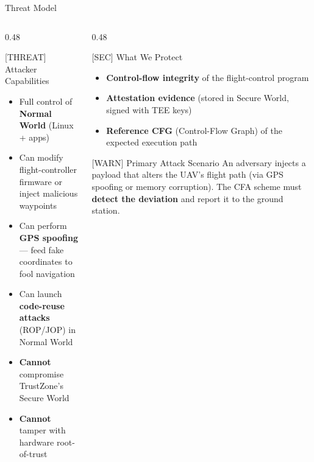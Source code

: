 \documentclass[aspectratio=169, 10pt]{beamer}
\begin{document}
\begin{frame}{Threat Model}
    \begin{columns}[T]
        \begin{column}{0.48\textwidth}
            \begin{warnbox}{[THREAT] Attacker Capabilities}
                \begin{itemize}
                    \item Full control of \textbf{Normal World} (Linux + apps)
                    \item Can modify flight-controller firmware or
                          inject malicious waypoints
                    \item Can perform \textbf{GPS spoofing} — feed fake
                          coordinates to fool navigation
                    \item Can launch \textbf{code-reuse attacks}
                          (ROP/JOP) in Normal World
                    \item \textbf{Cannot} compromise TrustZone's Secure World
                    \item \textbf{Cannot} tamper with hardware root-of-trust
                \end{itemize}
            \end{warnbox}
        \end{column}
        \begin{column}{0.48\textwidth}
            \begin{greenbox}{[SEC] What We Protect}
                \begin{itemize}
                    \item \textbf{Control-flow integrity} of the
                          flight-control program
                    \item \textbf{Attestation evidence} (stored in Secure World,
                          signed with TEE keys)
                    \item \textbf{Reference CFG} (Control-Flow Graph) of the
                          expected execution path
                \end{itemize}
            \end{greenbox}
            \vspace{6pt}
            \begin{defbox}{[WARN] Primary Attack Scenario}
                An adversary injects a payload that alters the UAV's flight
                path (via GPS spoofing or memory corruption).
                The CFA scheme must \textbf{detect the deviation} and report
                it to the ground station.
            \end{defbox}
        \end{column}
    \end{columns}
\end{frame}
\end{document}
